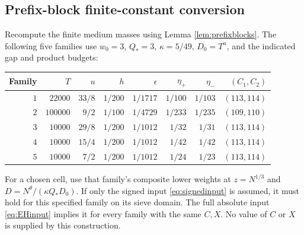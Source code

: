 \documentclass[11pt]{article}
\begin{document}
\subsection{Prefix-block finite-constant conversion}\label{sec:prefixdistribution}
Recompute the finite medium masses using Lemma \ref{lem:prefixblocks}.
The following five families use $w_0=3$, $Q_*=3$, $\kappa=5/49$,
$D_0=T^u$, and the indicated gap and product budgets:
\begin{center}
\small
\begin{tabular}{rrrrrrrr}\toprule
Family & $T$ & $u$ & $h$ & $\epsilon$ & $\eta_+$ & $\eta_-$ & $(C_1,C_2)$\\\midrule
$1$ & $22000$ & $33/8$ & $1/200$ & $1/1717$ & $1/100$ & $1/103$ & $(113,114)$\\
$2$ & $100000$ & $9/2$ & $1/100$ & $1/4729$ & $1/233$ & $1/235$ & $(109,110)$\\
$3$ & $10000$ & $29/8$ & $1/200$ & $1/1012$ & $1/32$ & $1/31$ & $(113,114)$\\
$4$ & $10000$ & $15/4$ & $1/200$ & $1/1012$ & $1/42$ & $1/42$ & $(113,114)$\\
$5$ & $10000$ & $7/2$ & $1/200$ & $1/1012$ & $1/24$ & $1/23$ & $(113,114)$\\
\bottomrule\end{tabular}
\end{center}
For a chosen cell, use that family's composite lower weights at
$z=N^{1/3}$ and $D=N^\theta/(\kappa Q_*D_0)$.
If only the signed input \eqref{eq:signedinput} is assumed, it must hold
for this specified family on its sieve domain. The full absolute input
\eqref{eq:EHinput} implies it for every family with the same $C,X$.
No value of $C$ or $X$ is supplied by this construction.
\end{document}
